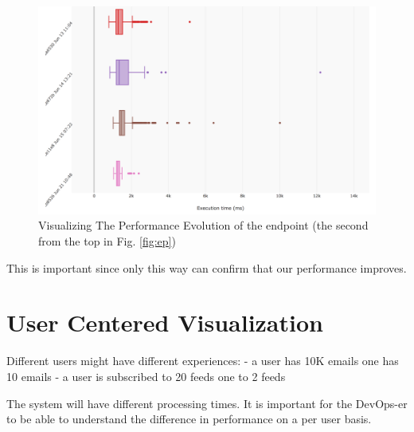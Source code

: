 \documentclass[conference]{IEEEtran}
\begin{document}
  \begin{figure}[h!]
    \centering
    \includegraphics[width=\linewidth]{translation_endpoint_evolution.png}
    \caption{Visualizing The Performance Evolution of the \epTranslations endpoint (the second from the top in Fig. \ref{fig:ep})}
    \label{fig:tee}
  \end{figure}

  This is important since only this way can confirm that our performance improves. 



\newpage
\section {User Centered Visualization}

  Different users might have different experiences: 
  - a user has 10K emails one has 10 emails
  - a user is subscribed to 20 feeds one to 2 feeds

  The system will have different processing times. 
  It is important for the DevOps-er to be able to understand the difference in performance on a per user basis. 
\end{document}
